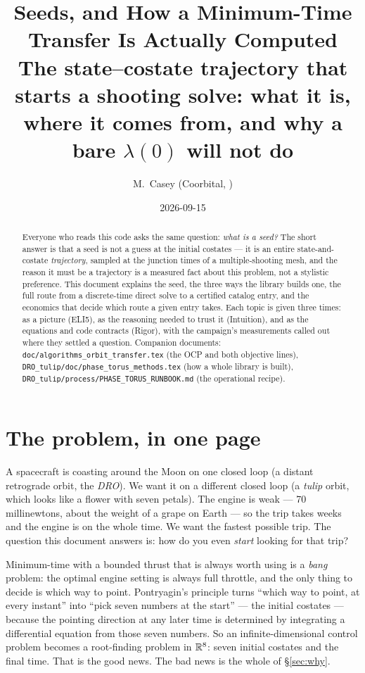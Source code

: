 \documentclass[11pt]{article}
\title{Seeds, and How a Minimum-Time Transfer Is Actually Computed\\
\large The state--costate trajectory that starts a shooting solve: what it is,\\
where it comes from, and why a bare $\lambda(0)$ will not do}
\author{M.~Casey \quad (Coorbital, \file{orbit\_transfer/DRO\_tulip})}
\date{2026-09-15}
\newcommand{\file}[1]{\texttt{#1}}
\begin{document}
\maketitle

\begin{abstract}
Everyone who reads this code asks the same question: \emph{what is a seed?}
The short answer is that a seed is not a guess at the initial costates --- it
is an entire state-and-costate \emph{trajectory}, sampled at the junction
times of a multiple-shooting mesh, and the reason it must be a trajectory is
a measured fact about this problem, not a stylistic preference. This document
explains the seed, the three ways the library builds one, the full route from
a discrete-time direct solve to a certified catalog entry, and the economics
that decide which route a given entry takes. Each topic is given three times:
as a picture (ELI5), as the reasoning needed to trust it (Intuition), and as
the equations and code contracts (Rigor), with the campaign's measurements
called out where they settled a question. Companion documents:
\file{doc/algorithms\_orbit\_transfer.tex} (the OCP and both objective lines),
\file{DRO\_tulip/doc/phase\_torus\_methods.tex} (how a whole library is built),
\file{DRO\_tulip/process/PHASE\_TORUS\_RUNBOOK.md} (the operational recipe).
\end{abstract}

\tableofcontents

\section{The problem, in one page}

\begin{eli}
A spacecraft is coasting around the Moon on one closed loop (a distant
retrograde orbit, the \emph{DRO}). We want it on a different closed loop (a
\emph{tulip} orbit, which looks like a flower with seven petals). The engine
is weak --- 70 millinewtons, about the weight of a grape on Earth --- so the
trip takes weeks and the engine is on the whole time. We want the fastest
possible trip. The question this document answers is: how do you even
\emph{start} looking for that trip?
\end{eli}

\begin{intu}
Minimum-time with a bounded thrust that is always worth using is a
\emph{bang} problem: the optimal engine setting is always full throttle, and
the only thing to decide is which way to point. Pontryagin's principle turns
``which way to point, at every instant'' into ``pick seven numbers at the
start'' --- the initial costates --- because the pointing direction at any
later time is determined by integrating a differential equation from those
seven numbers. So an infinite-dimensional control problem becomes a
root-finding problem in $\mathbb{R}^8$: seven initial costates and the final time.
That is the good news. The bad news is the whole of \S\ref{sec:why}.
\end{intu}
\end{document}
